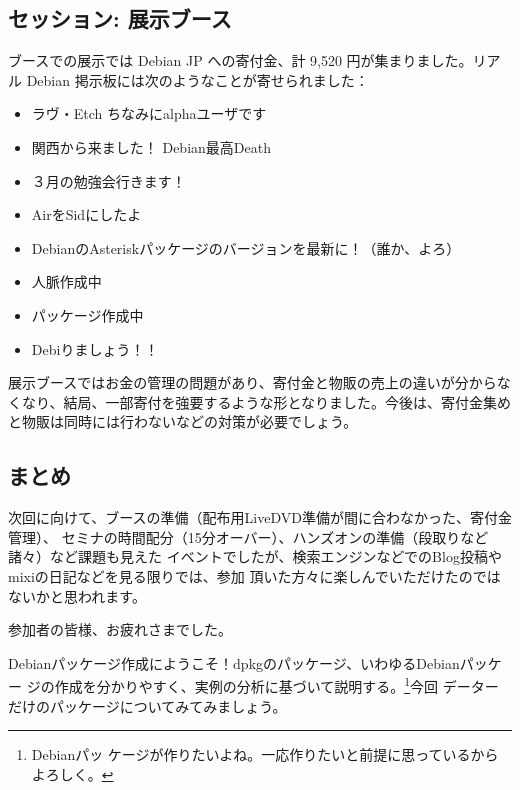 \documentclass[mingoth,a4paper]{jsarticle}
\begin{document}
\subsection{セッション: 展示ブース}
ブースでの展示では Debian JP への寄付金、計 9,520 円が集まりました。リアル Debian 掲示板には次のようなことが寄せられました：
\begin{multicols}{2}
 
 \begin{itemize}
    \item ラヴ・Etch ちなみにalphaユーザです
    \item 関西から来ました！ Debian最高Death
    \item ３月の勉強会行きます！
    \item AirをSidにしたよ
    \item DebianのAsteriskパッケージのバージョンを最新に！（誰か、よろ）
    \item 人脈作成中
    \item パッケージ作成中
    \item Debiりましょう！！
 \end{itemize}
\end{multicols}

展示ブースではお金の管理の問題があり、寄付金と物販の売上の違いが分からなくなり、結局、一部寄付を強要するような形となりました。今後は、寄付金集めと物販は同時には行わないなどの対策が必要でしょう。


\subsection{まとめ}
次回に向けて、ブースの準備（配布用LiveDVD準備が間に合わなかった、寄付金管理）、
セミナの時間配分（15分オーバー）、ハンズオンの準備（段取りなど諸々）など課題も見えた
イベントでしたが、検索エンジンなどでのBlog投稿やmixiの日記などを見る限りでは、参加
頂いた方々に楽しんでいただけたのではないかと思われます。

参加者の皆様、お疲れさまでした。

\label{sec:datapackage}

Debianパッケージ作成にようこそ！dpkgのパッケージ、いわゆるDebianパッケー
ジの作成を分かりやすく、実例の分析に基づいて説明する。\footnote{Debianパッ
ケージが作りたいよね。一応作りたいと前提に思っているからよろしく。}今回
データーだけのパッケージについてみてみましょう。
\end{document}
